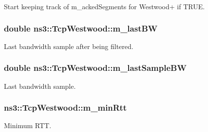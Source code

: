 Start keeping track of m\+\_\+acked\+Segments for Westwood+ if T\+R\+UE. 

\subsubsection[{\texorpdfstring{m\+\_\+last\+BW}{m_lastBW}}]{\setlength{\rightskip}{0pt plus 5cm}double ns3\+::\+Tcp\+Westwood\+::m\+\_\+last\+BW\hspace{0.3cm}{\ttfamily [protected]}}\hypertarget{classns3_1_1TcpWestwood_aadc6e09132619de3079c7bfbbc7df5ef}{}\label{classns3_1_1TcpWestwood_aadc6e09132619de3079c7bfbbc7df5ef}


Last bandwidth sample after being filtered. 

\subsubsection[{\texorpdfstring{m\+\_\+last\+Sample\+BW}{m_lastSampleBW}}]{\setlength{\rightskip}{0pt plus 5cm}double ns3\+::\+Tcp\+Westwood\+::m\+\_\+last\+Sample\+BW\hspace{0.3cm}{\ttfamily [protected]}}\hypertarget{classns3_1_1TcpWestwood_ac7b94cf0c7c62cb706293a236055447d}{}\label{classns3_1_1TcpWestwood_ac7b94cf0c7c62cb706293a236055447d}


Last bandwidth sample. 

\subsubsection[{\texorpdfstring{m\+\_\+min\+Rtt}{m_minRtt}}]{ ns3\+::\+Tcp\+Westwood\+::m\+\_\+min\+Rtt\hspace{0.3cm}{\ttfamily [protected]}}\hypertarget{classns3_1_1TcpWestwood_aa6eadb9dc36f52a850aa06ffea8c2dda}{}\label{classns3_1_1TcpWestwood_aa6eadb9dc36f52a850aa06ffea8c2dda}


Minimum R\+TT. 

